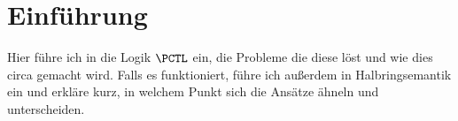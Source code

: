 \section{Einführung}

Hier führe ich in die Logik $\PCTL$ ein, die Probleme die diese löst und wie dies circa gemacht wird.
Falls es funktioniert, führe ich außerdem in Halbringsemantik ein und erkläre kurz, in welchem Punkt sich die Ansätze ähneln und unterscheiden.